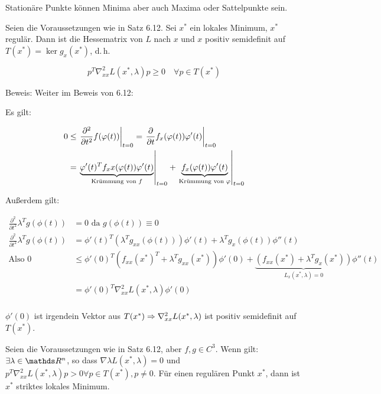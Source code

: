 
Stationäre Punkte können Minima aber auch Maxima oder Sattelpunkte sein.


Seien die Voraussetzungen wie in Satz 6.12. Sei $x^*$ ein lokales Minimum, $x^*$ regulär. Dann ist die Hessematrix von $L$ nach $x$ und $x$ positiv semidefinit auf $T(x^*) = \ker g_x(x^*)$, d.\,h.

\[ p^T \nabla_{xx}^2 L(x^*, \lambda) p \geq 0 \quad \forall p \in T(x^*) \]

Beweis: Weiter im Beweis von 6.12:

Es gilt:

\begin{align*}
0 &\leq \left. \frac{\partial^2}{\partial t^2} f(\varphi(t)) \right|_{t=0} = \left. \frac{\partial}{\partial t} f_x(\varphi(t)) \varphi'(t) \right|_{t=0} \\
&= \left. \underbrace{ \varphi'(t)^T f_xx(\varphi(t)) \varphi'(t)}_{\text{Krümmung von } f} \right|_{t=0} + \left. \underbrace{f_x(\varphi(t)) \varphi'(t)}_{\text{Krümmung von } \varphi} \right|_{t=0} \\
\end{align*}

Außerdem gilt:

\begin{align*}
\frac{\partial^2}{\partial t^2} \lambda^T g(\phi(t)) &= 0 \text{ da } g(\phi(t)) \equiv 0 \\
\frac{\partial^2}{\partial t^2} \lambda^T g(\phi(t)) &= \phi'(t)^T (\lambda^T g_{xx} (\phi(t))) \phi'(t) + \lambda^T g_x(\phi(t)) \phi''(t) \\
\text{Also } 0 & \leq \phi'(0)^T (f_{xx} (x^*)^T + \lambda^T g_{xx}(x^*)) \phi'(0) + \underbrace{(f_{xx}(x^*) + \lambda^T g_x(x^*))}_{L_{x} (x^*, \lambda) = 0} \phi''(t) \\
&= \phi'(0)^T \nabla_{xx}^2 L(x^*, \lambda) \phi'(0) \\
\end{align*}

$\phi'(0)$ ist irgendein Vektor aus $T(x^*) \Rightarrow \nabla_{xx}^2 L(x^*, \lambda)$ ist positiv semidefinit auf $T(x^*)$.


Seien die Voraussetzungen wie in Satz 6.12, aber $f,g\in C^3$. Wenn gilt: $\exists \lambda \in \R^n$, so dass $\nabla \lambda L(x^*, \lambda) = 0$ und $p^T \nabla_{xx}^2 L(x^*, \lambda) p > 0 \forall p \in T(x^*), p \neq 0$. Für einen regulären Punkt $x^*$, dann ist $x^*$ striktes lokales Minimum.

